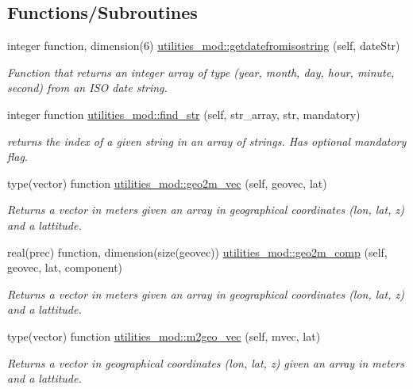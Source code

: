 \subsection*{Functions/\+Subroutines}
\begin{DoxyCompactItemize}
\item 
integer function, dimension(6) \mbox{\hyperlink{namespaceutilities__mod_ab5b97f243f9347a40db76d55509d37ca}{utilities\+\_\+mod\+::getdatefromisostring}} (self, date\+Str)
\begin{DoxyCompactList}\small\item\em Function that returns an integer array of type (year, month, day, hour, minute, second) from an I\+SO date string. \end{DoxyCompactList}\item 
integer function \mbox{\hyperlink{namespaceutilities__mod_ad446cce78a6509db0e839439a0e84564}{utilities\+\_\+mod\+::find\+\_\+str}} (self, str\+\_\+array, str, mandatory)
\begin{DoxyCompactList}\small\item\em returns the index of a given string in an array of strings. Has optional mandatory flag. \end{DoxyCompactList}\item 
type(vector) function \mbox{\hyperlink{namespaceutilities__mod_a3d3d0e1568b178cd3e0bb8013642946c}{utilities\+\_\+mod\+::geo2m\+\_\+vec}} (self, geovec, lat)
\begin{DoxyCompactList}\small\item\em Returns a vector in meters given an array in geographical coordinates (lon, lat, z) and a lattitude. \end{DoxyCompactList}\item 
real(prec) function, dimension(size(geovec)) \mbox{\hyperlink{namespaceutilities__mod_aff2244d9152396064656f20f4936a18c}{utilities\+\_\+mod\+::geo2m\+\_\+comp}} (self, geovec, lat, component)
\begin{DoxyCompactList}\small\item\em Returns a vector in meters given an array in geographical coordinates (lon, lat, z) and a lattitude. \end{DoxyCompactList}\item 
type(vector) function \mbox{\hyperlink{namespaceutilities__mod_a70b21b18c8633b7fd4c3057530d3f16f}{utilities\+\_\+mod\+::m2geo\+\_\+vec}} (self, mvec, lat)
\begin{DoxyCompactList}\small\item\em Returns a vector in geographical coordinates (lon, lat, z) given an array in meters and a lattitude. \end{DoxyCompactList}\item 

\end{DoxyCompactItemize}
